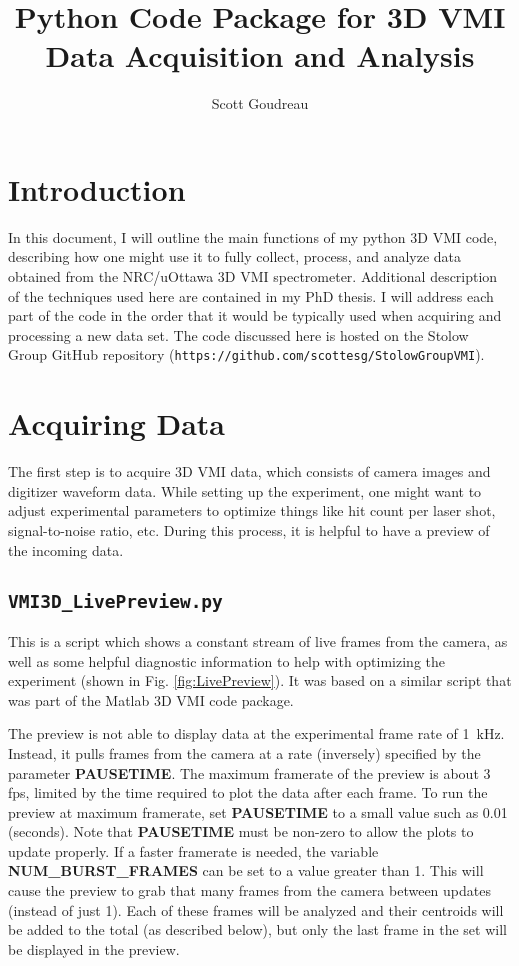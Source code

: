\documentclass[12pt]{article}
\title{Python Code Package for 3D VMI \\ Data Acquisition and Analysis \\ \version}
\author{Scott Goudreau}
\begin{document}
\maketitle

\section{Introduction}

In this document, I will outline the main functions of my python 3D VMI code, describing how one might use it to fully collect, process, and analyze data obtained from the NRC/uOttawa 3D VMI spectrometer.
Additional description of the techniques used here are contained in my PhD thesis.
I will address each part of the code in the order that it would be typically used when acquiring and processing a new data set.
The code discussed here is hosted on the Stolow Group GitHub repository (\texttt{https://github.com/scottesg/StolowGroupVMI}).

\section{Acquiring Data}

The first step is to acquire 3D VMI data, which consists of camera images and digitizer waveform data.
While setting up the experiment, one might want to adjust experimental parameters to optimize things like hit count per laser shot, signal-to-noise ratio, etc.
During this process, it is helpful to have a preview of the incoming data.

\subsection{\texttt{VMI3D\_LivePreview.py}} 

This is a script which shows a constant stream of live frames from the camera, as well as some helpful diagnostic information to help with optimizing the experiment (shown in Fig. \ref{fig:LivePreview}).
It was based on a similar script that was part of the Matlab 3D VMI code package.

The preview is not able to display data at the experimental frame rate of 1~kHz.
Instead, it pulls frames from the camera at a rate (inversely) specified by the parameter \textbf{PAUSETIME}.
The maximum framerate of the preview is about 3 fps, limited by the time required to plot the data after each frame.
To run the preview at maximum framerate, set \textbf{PAUSETIME} to a small value such as 0.01 (seconds).
Note that \textbf{PAUSETIME} must be non-zero to allow the plots to update properly.
If a faster framerate is needed, the variable \textbf{NUM\_BURST\_FRAMES} can be set to a value greater than 1.
This will cause the preview to grab that many frames from the camera between updates (instead of just 1).
Each of these frames will be analyzed and their centroids will be added to the total (as described below), but only the last frame in the set will be displayed in the preview.
\end{document}
